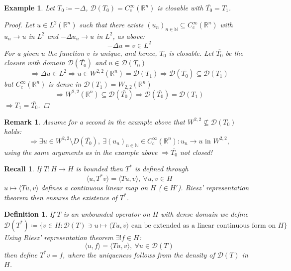 \documentclass[12pt]{extreport} %
\newcommand{\N}{\mathbb{N}}
\newcommand{\R}{\mathbb{R}}
\newcommand{\DO}[1]{\mathcal{D}\left( {#1} \right)}
\theoremstyle{named}
\theoremstyle{nnamed}
\theoremstyle{itshape}
\newtheorem{definition}{Definition}  \counterwithin{definition}{chapter}
\theoremstyle{normal}
\newtheorem*{recall}{Recall}
\newtheorem*{example}{Example}
\newtheorem*{remark}{Remark}
\begin{document}
\begin{example}
	Let $T_0 \coloneqq - \Delta$, $\DO{T_0} = C_c^\infty(\R^n)$ is closable with $\overline{T_0} = T_1$.
	 
	\begin{proof}
		Let $u \in L^2(\R^n)$ such that there exists $(u_n)_{n \in \N} \subseteq C_c^\infty(\R^n)$ with $u_n \rightarrow u$ in $L^2$ and $-\Delta u_n \rightarrow u$ in $L^2$, as above: 
		$$ -\Delta u = v \in L^2 $$
		For a given $u$ the function $v$ is unique, and hence, $T_0$ is closable. Let $\overline{T_0}$ be the closure with domain $\DO{\overline{T_0}}$ and $u \in \DO{T_0}$
		$$ \Rightarrow \Delta u \in L^2 \Rightarrow u \in W^{2,2}(\R^n) = \DO{T_1} \Rightarrow \DO{\overline{T_0}} \subseteq \DO{T_1} $$
		but $C_c^{\infty}(\R^n)$ is dense in $\DO{T_1} = W_{2,2}(\R^n)$
		$$ \Rightarrow W^{2,2}(\R^n) \subseteq \DO{\overline{T_0}} \Rightarrow \DO{\overline{T_0}} = \DO{T_1} $$
		$\Rightarrow T_1 = \overline{T_0}$. 
	\end{proof}	
\end{example}

\begin{remark}
	Assume for a second in the example above that $W^{2,2} \not\subseteq \DO{T_0}$ holds:
		$$ \Rightarrow \exists u \in W^{2, 2} \setminus D \left( \overline{T_0} \right), ~\exists (u_n)_{n \in \N} \in C^{\infty}_c (\R^n): u_n \rightarrow u \text{ in } W^{2, 2}, $$
		using the same arguments as in the example above $\Rightarrow \overline{T_0}$ not closed!	
\end{remark}


\begin{recall}
	If $T \colon H \rightarrow H$ is bounded then $T^*$ is defined through
	$$ \langle u , T^* v \rangle = \langle T u , v \rangle, ~ \forall u, v \in H $$	
	$u \mapsto \langle T u, v \rangle$ defines a continuous linear map on $H$ ($\in H'$). Riesz' representation theorem then ensures the existence of $T^*$.
\end{recall}

\begin{definition}
	If $T$ is an unbounded operator on $H$ with dense domain we define
		$$ \DO{T^*} \coloneqq \big\{ v \in H \colon \DO{T} \ni u \mapsto \langle T u, v \rangle \text{ can be extended as a linear continuous form on } H \big\} $$
	Using Riesz' representation theorem $\exists! f \in H$:
		$$ \langle u, f \rangle = \langle T u, v \rangle, ~ \forall u \in \DO{T} $$
	then define $T^* v = f$, where the uniqueness follows from the density of $\DO{T}$ in $H$.
\end{definition}
\end{document}
